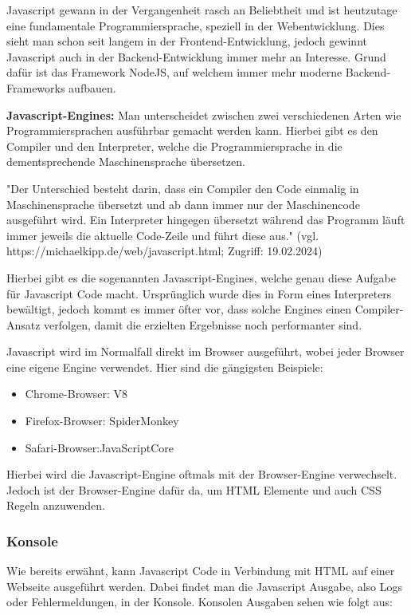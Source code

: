 Javascript gewann in der Vergangenheit rasch an Beliebtheit und ist heutzutage eine fundamentale Programmiersprache, speziell in der Webentwicklung. Dies sieht man schon seit langem in der Frontend-Entwicklung, jedoch gewinnt Javascript auch in der Backend-Entwicklung immer mehr an Interesse. Grund dafür ist das Framework NodeJS, auf welchem  immer mehr moderne Backend-Frameworks aufbauen.

\textbf{Javascript-Engines:}
\newline
Man unterscheidet zwischen zwei verschiedenen Arten wie Programmiersprachen ausführbar gemacht werden kann. Hierbei gibt es den Compiler und den Interpreter, welche die Programmiersprache in die dementsprechende Maschinensprache übersetzen.

"Der Unterschied besteht darin, dass ein Compiler den Code einmalig in Maschinensprache übersetzt und ab dann immer nur der Maschinencode ausgeführt wird. Ein Interpreter hingegen übersetzt während das Programm läuft immer jeweils die aktuelle Code-Zeile und führt diese aus."
\newline
(vgl. https://michaelkipp.de/web/javascript.html; Zugriff: 19.02.2024)

Hierbei gibt es die sogenannten Javascript-Engines, welche genau diese Aufgabe für Javascript Code macht. Ursprünglich wurde dies in Form eines Interpreters bewältigt, jedoch kommt es immer öfter vor, dass solche Engines einen Compiler-Ansatz verfolgen, damit die erzielten Ergebnisse noch performanter sind.

Javascript wird im Normalfall direkt im Browser ausgeführt, wobei jeder Browser eine eigene Engine verwendet. Hier sind die gängigsten Beispiele:

\begin{itemize}
  \item Chrome-Browser: V8
  \item Firefox-Browser: SpiderMonkey
  \item Safari-Browser:JavaScriptCore
\end{itemize}

Hierbei wird die Javascript-Engine oftmals mit der Browser-Engine verwechselt. Jedoch ist der Browser-Engine dafür da, um HTML Elemente und auch CSS Regeln anzuwenden. 

\subsubsection{Konsole}
Wie bereits erwähnt, kann Javascript Code in Verbindung mit HTML auf einer Webseite ausgeführt werden. Dabei findet man die Javascript Ausgabe, also Logs oder Fehlermeldungen, in der Konsole. Konsolen Ausgaben sehen wie folgt aus:

